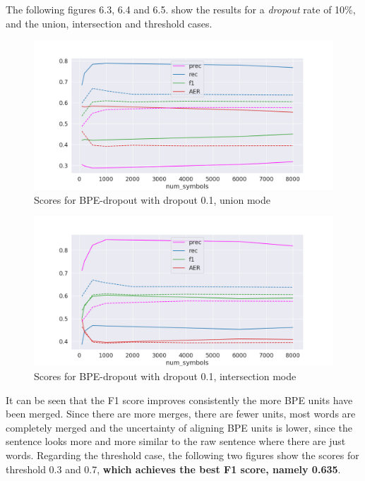 The following figures 6.3, 6.4 and 6.5. show the results for a \emph{dropout} rate of 10\%, and the union, intersection and threshold cases.

 \begin{figure}[!ht]
     \centering
     \includegraphics[width=12cm]{../reports/scores_dropout_bpe/space/0.1/eng_deu_union_fastalign.png}
     \caption{Scores for BPE-dropout with dropout 0.1, union mode}
 \end{figure}
 
 \begin{figure}[!ht]
     \centering
     \includegraphics[width=12cm]{../reports/scores_dropout_bpe/space/0.1/eng_deu_inter_fastalign.png}
     \caption{Scores for BPE-dropout with dropout 0.1, intersection mode}
 \end{figure}

It can be seen that the F1 score improves consistently the more BPE units have been merged. Since there are more merges, there are fewer units, most words are completely merged and the uncertainty of aligning BPE units is lower, since the sentence looks more and more similar to the raw sentence where there are just words. Regarding the threshold case, the following two figures show the scores for threshold 0.3 and 0.7, \textbf{which achieves the best F1 score, namely 0.635}.

